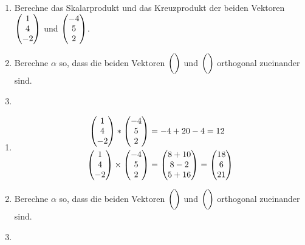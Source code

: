 \begin{enumerate}
	\item Berechne das Skalarprodukt und das Kreuzprodukt der beiden Vektoren $\begin{pmatrix} 1\\4\\-2 \end{pmatrix}$ und $\begin{pmatrix} -4\\5\\2 \end{pmatrix}$.
	\item Berechne $\alpha$ so, dass die beiden Vektoren $\begin{pmatrix} \\\\ \end{pmatrix}$ und $\begin{pmatrix} \\\\ \end{pmatrix}$ orthogonal zueinander sind.
	\item
\end{enumerate}
\begin{lsg}{}
	\begin{enumerate}
		\item \begin{align*}
			\begin{pmatrix} 1\\4\\-2 \end{pmatrix}*\begin{pmatrix} -4\\5\\2 \end{pmatrix}&=-4+20-4=12 \\
			\begin{pmatrix} 1\\4\\-2 \end{pmatrix}\times\begin{pmatrix} -4\\5\\2 \end{pmatrix}&=\begin{pmatrix} 8+10\\8-2\\5+16 \end{pmatrix}=\begin{pmatrix} 18\\6\\21 \end{pmatrix}
		\end{align*}
		\item Berechne $\alpha$ so, dass die beiden Vektoren $\begin{pmatrix} \\\\ \end{pmatrix}$ und $\begin{pmatrix} \\\\ \end{pmatrix}$ orthogonal zueinander sind.
		\item
	\end{enumerate}
\end{lsg}



